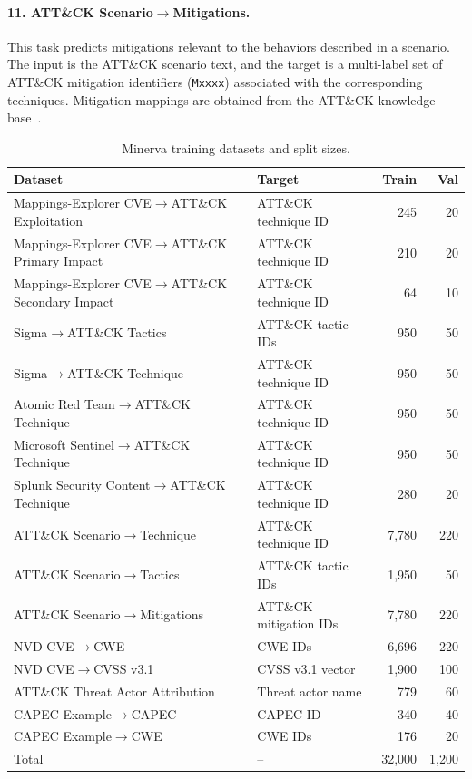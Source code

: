 \paragraph{11. ATT\&CK Scenario$\rightarrow$Mitigations.}
This task predicts mitigations relevant to the behaviors described in a scenario. The input is the ATT\&CK scenario text, and the target is a multi-label set of ATT\&CK mitigation identifiers (\texttt{Mxxxx}) associated with the corresponding techniques. Mitigation mappings are obtained from the ATT\&CK knowledge base~\citep{mitre_attack,attack_stix_data}.






\begin{table}[t]
\vskip 0.15in
\begin{center}
\begin{small}
\caption{Minerva training datasets and split sizes.}
\label{tab:minerva-datasets}
\begin{tabular}{l l r r}
\toprule
Dataset & Target & Train & Val \\
\midrule
Mappings-Explorer CVE$\rightarrow$ATT\&CK Exploitation & ATT\&CK technique ID & 245 & 20 \\
Mappings-Explorer CVE$\rightarrow$ATT\&CK Primary Impact & ATT\&CK technique ID & 210 & 20 \\
Mappings-Explorer CVE$\rightarrow$ATT\&CK Secondary Impact & ATT\&CK technique ID & 64 & 10 \\
Sigma$\rightarrow$ATT\&CK Tactics & ATT\&CK tactic IDs & 950 & 50 \\
Sigma$\rightarrow$ATT\&CK Technique & ATT\&CK technique ID & 950 & 50 \\
Atomic Red Team$\rightarrow$ATT\&CK Technique & ATT\&CK technique ID & 950 & 50 \\
Microsoft Sentinel$\rightarrow$ATT\&CK Technique & ATT\&CK technique ID & 950 & 50 \\
Splunk Security Content$\rightarrow$ATT\&CK Technique & ATT\&CK technique ID & 280 & 20 \\
ATT\&CK Scenario$\rightarrow$Technique & ATT\&CK technique ID & 7{,}780 & 220 \\
ATT\&CK Scenario$\rightarrow$Tactics & ATT\&CK tactic IDs & 1{,}950 & 50 \\
ATT\&CK Scenario$\rightarrow$Mitigations & ATT\&CK mitigation IDs & 7{,}780 & 220 \\
NVD CVE$\rightarrow$CWE & CWE IDs & 6{,}696 & 220 \\
NVD CVE$\rightarrow$CVSS v3.1 & CVSS v3.1 vector & 1{,}900 & 100 \\
ATT\&CK Threat Actor Attribution & Threat actor name & 779 & 60 \\
CAPEC Example$\rightarrow$CAPEC & CAPEC ID & 340 & 40 \\
CAPEC Example$\rightarrow$CWE & CWE IDs & 176 & 20 \\
\midrule
Total & -- & 32{,}000 & 1{,}200 \\
\bottomrule
\end{tabular}
\end{small}
\end{center}
\vskip -0.1in
\end{table}
